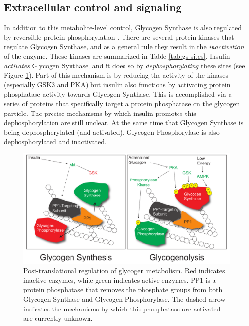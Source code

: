 \documentclass{tufte-handout}
\begin{document}
\subsection{Extracellular control and signaling}

In addition to this metabolite-level control, Glycogen Synthase is also regulated by reversible protein phosphorylation \citep{Larner1960}.  There are several protein kinases that regulate Glycogen Synthase, and as a general rule they result in the \emph{inactivation} of the enzyme.  These kinases are summarized in Table \ref{tab:gs-sites}.  Insulin \emph{activates} Glycogen Synthase, and it does so by \emph{dephosphorylating} these sites (see Figure \ref{fig:glycogen-phosphorylation}).  Part of this mechanism is by reducing the activity of the kinases (especially GSK3  and PKA) but insulin also functions by activating protein phosphatase activity towards Glycogen Synthase.  This is accomplished via a series of proteins that specifically target a protein phosphatase on the glycogen particle.  The precise mechanisms by which insulin promotes this dephosphorylation are still unclear.  At the same time that Glycogen Synthase is being dephosphorylated (and activated), Glycogen Phosphorylase is also dephosphorylated and inactivated.

\begin{figure}
\includegraphics{figures/glycogen-phosphorylation}
\caption{Post-translational regulation of glycogen metabolism.  Red indicates inactive enzymes, while green indicates active enzymes. PP1 is a protein phosphatase that removes the phosphate groups from both Glycogen Synthase and Glycogen Phosphorylase.  The dashed arrow indicates the mechanisms by which this phosphatase are activated are currently unknown.}
\label{fig:glycogen-phosphorylation}
\end{figure}
\end{document}
